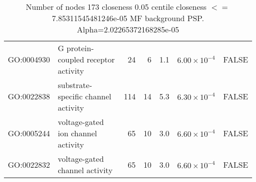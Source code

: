 \begin{table}[ht]
\begin{adjustbox}{max width=\textwidth}
\begin{tabular}{llrrrrl}
  GO:0004930 & G protein-coupled receptor activity & 24 & 6 & 1.1 & $6.00 \times 10^{-4}$ & FALSE \\ 
  GO:0022838 & substrate-specific channel activity & 114 & 14 & 5.3 & $6.30 \times 10^{-4}$ & FALSE \\ 
  GO:0005244 & voltage-gated ion channel activity & 65 & 10 & 3.0 & $6.60 \times 10^{-4}$ & FALSE \\ 
  GO:0022832 & voltage-gated channel activity & 65 & 10 & 3.0 & $6.60 \times 10^{-4}$ & FALSE \\ 
   \hline
\end{tabular}
\end{adjustbox}
\caption{Number of nodes 173 closeness 0.05 centile  closeness $<=$ 7.85311545481246e-05 MF background PSP. Alpha=2.02265372168285e-05} 
\label{tab:Number of nodes 173 closeness 0.05 centile  closeness $<=$ 7.85311545481246e-05 MF background PSP. Alpha=2.02265372168285e-05}
\end{table}

